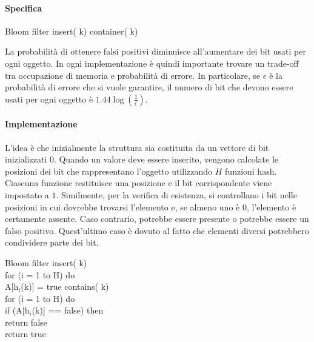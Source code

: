 \paragraph{Specifica}
\begin{code}{Bloom filter}
    insert( k)
    \nl{}
     container( k)
\end{code}

\noindent
La probabilità di ottenere falsi positivi diminuisce all'aumentare dei bit usati
per ogni oggetto. In ogni implementazione è quindi importante trovare un
trade-off tra occupazione di memoria e probabilità di errore. In particolare,
se $\epsilon$ è la probabilità di errore che si vuole garantire, il numero di
bit che devono essere usati per ogni oggetto è $1.44\log(\frac{1}{\epsilon})$.

\paragraph{Implementazione}
L'idea è che inizialmente la struttura sia costituita da un vettore di bit
inizializzati $0$. Quando un valore deve essere inserito, vengono calcolate le
posizioni dei bit che rappresentano l'oggetto utilizzando $H$ funzioni hash.
Ciascuna funzione restituisce una posizione e il bit corrispondente viene
impostato a $1$. Similmente, per la verifica di esistenza, si controllano i
bit nelle posizioni in cui dovrebbe trovarsi l'elemento e, se almeno uno è $0$,
l'elemento è certamente assente. Caso contrario, potrebbe essere presente o
potrebbe essere un falso positivo. Quest'ultimo caso è dovuto al fatto che
elementi diversi potrebbero condividere parte dei bit.

\begin{minicode}{Bloom filter}
\ind insert( k)\\
    \indf for (i = 1 to H) do\\
        A[h$_i$(k)] = true
\nl\ind{} contains( k)\\
    \indf for (i = 1 to H) do\\
        \indff if (A[h$_i$(k)] == false) then\\
            return false\\
    \indf return true
\end{minicode}

